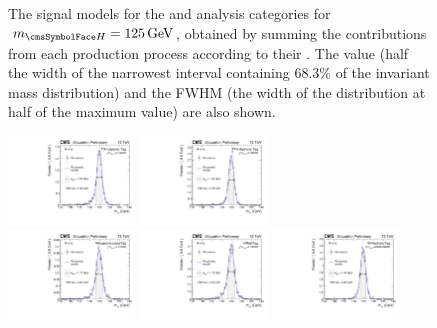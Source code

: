 \begin{figure}[ht!]
\caption{The signal models for the \Untagged and \VBFTag analysis categories for $\mH=125\GeV$, obtained by summing the contributions from each production process according to their \effxacc. The \effSigma value (half the width of the narrowest interval containing 68.3\% of the invariant mass distribution) and the FWHM (the width of the distribution at half of the maximum value) are also shown.}

\label{fig:model:sig_model_per_category}
\end{figure}

\begin{figure}[ht!]
\centering
\includegraphics[width=0.3\textwidth]{modellingFigures/DCBpG/TTHLeptonicTag.pdf} 
\includegraphics[width=0.3\textwidth]{modellingFigures/DCBpG/TTHHadronicTag.pdf}  \\
\includegraphics[width=0.3\textwidth]{modellingFigures/DCBpG/VHLeptonicLooseTag.pdf} 
\includegraphics[width=0.3\textwidth]{modellingFigures/DCBpG/VHMetTag.pdf} 
\includegraphics[width=0.3\textwidth]{modellingFigures/DCBpG/VHHadronicTag.pdf} \\

\end{figure}
